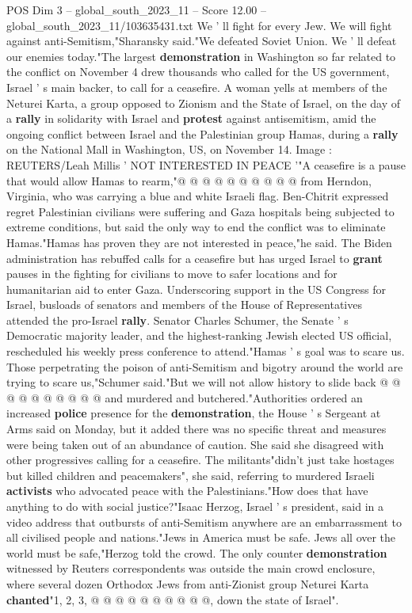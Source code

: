 \begin{textsample}{POS Dim 3 – global\_south\_2023\_11 – Score 12.00 – global\_south\_2023\_11/103635431.txt}
We ' ll fight for every Jew.
We will fight against anti-Semitism,"Sharansky said."We defeated Soviet Union.
We ' ll defeat our enemies today."The largest \textbf{demonstration} in Washington so far related to the conflict on November 4 drew thousands who called for the US government, Israel ' s main backer, to call for a ceasefire.
A woman yells at members of the Neturei Karta, a group opposed to Zionism and the State of Israel, on the day of a \textbf{rally} in solidarity with Israel and \textbf{protest} against antisemitism, amid the ongoing conflict between Israel and the Palestinian group Hamas, during a \textbf{rally} on the National Mall in Washington, US, on November 14.
Image : REUTERS/Leah Millis ' NOT INTERESTED IN PEACE '"A ceasefire is a pause that would allow Hamas to rearm,"@ @ @ @ @ @ @ @ @ @ from Herndon, Virginia, who was carrying a blue and white Israeli flag.
Ben-Chitrit expressed regret Palestinian civilians were suffering and Gaza hospitals being subjected to extreme conditions, but said the only way to end the conflict was to eliminate Hamas."Hamas has proven they are not interested in peace,"he said.
The Biden administration has rebuffed calls for a ceasefire but has urged Israel to \textbf{grant} pauses in the fighting for civilians to move to safer locations and for humanitarian aid to enter Gaza.
Underscoring support in the US Congress for Israel, busloads of senators and members of the House of Representatives attended the pro-Israel \textbf{rally}.
Senator Charles Schumer, the Senate ' s Democratic majority leader, and the highest-ranking Jewish elected US official, rescheduled his weekly press conference to attend."Hamas ' s goal was to scare us.
Those perpetrating the poison of anti-Semitism and bigotry around the world are trying to scare us,"Schumer said."But we will not allow history to slide back @ @ @ @ @ @ @ @ @ @ and murdered and butchered."Authorities ordered an increased \textbf{police} presence for the \textbf{demonstration}, the House ' s Sergeant at Arms said on Monday, but it added there was no specific threat and measures were being taken out of an abundance of caution.
She said she disagreed with other progressives calling for a ceasefire.
The militants"didn't just take hostages but killed children and peacemakers", she said, referring to murdered Israeli \textbf{activists} who advocated peace with the Palestinians."How does that have anything to do with social justice?"Isaac Herzog, Israel ' s president, said in a video address that outbursts of anti-Semitism anywhere are an embarrassment to all civilised people and nations."Jews in America must be safe.
Jews all over the world must be safe,"Herzog told the crowd.
The only counter \textbf{demonstration} witnessed by Reuters correspondents was outside the main crowd enclosure, where several dozen Orthodox Jews from anti-Zionist group Neturei Karta \textbf{chanted}"1, 2, 3, @ @ @ @ @ @ @ @ @ @, down the state of Israel".

\end{textsample}
